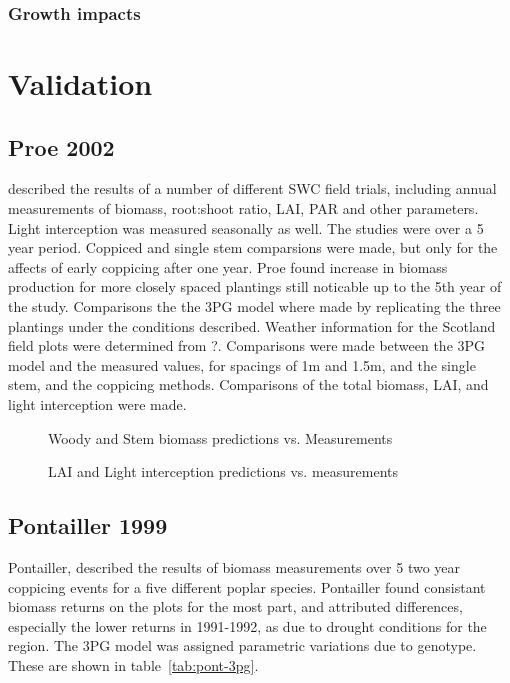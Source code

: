 \documentclass[10pt]{article}
\begin{document}


\subsubsection{Growth impacts}
\label{sec:growth-impacts}

\section*{Validation}

\subsection*{Proe 2002}

\cite{Proe2002} described the results of a number of different SWC
field trials, including annual measurements of biomass, root:shoot
ratio, LAI, PAR and other parameters.  Light interception was measured
seasonally as well.  The studies were over a 5 year period. Coppiced
and single stem comparsions were made, but only for the affects of
early coppicing after one year.  Proe found increase in biomass
production for more closely spaced plantings still noticable up to the
5th year of the study.  Comparisons the the 3PG model where made by
replicating the three plantings under the conditions described.
Weather information for the Scotland field plots were determined from
?.  Comparisons were made between the 3PG model and the measured
values, for spacings of 1m and 1.5m, and the single stem, and the
coppicing methods.  Comparisons of the total biomass, LAI, and light
interception were made. 

\begin{figure}
  \centering
  
  \caption{Woody and Stem biomass predictions vs. Measurements}
  \label{fig:proe-wood}
\end{figure}

\begin{figure}[!ht]
  \centering
  
  \caption{LAI and Light interception predictions vs. measurements}
  \label{fig:proe-light}
\end{figure}

\subsection{Pontailler 1999}
\label{sec:pont}

Pontailler, \cite{pontailler99biomass-yield} described the results of
biomass measurements over 5 two year coppicing events for a five
different poplar species.  Pontailler found consistant biomass returns
on the plots for the most part, and attributed differences, especially
the lower returns in 1991-1992, as due to drought conditions for the
region.  The 3PG model was assigned parametric variations due to
genotype.  These are shown in table~\ref{tab:pont-3pg}.
\end{document}
